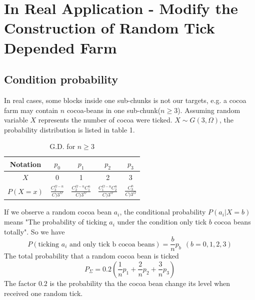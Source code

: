 \documentclass[UTF8,a4paper,15pt,titlepage,scale=0.8]{article}
\begin{document}
\section{In Real Application - Modify the Construction of Random Tick Depended Farm}
    \subsection{Condition probability}
        In real cases, some blocks inside one sub-chunks is not our targets, e.g. a cocoa farm may contain $n$ cocoa-beans in one sub-chunk($n\geq 3$). Assuming random variable $X$ represents the number of cocoa were ticked. $X \sim G(3,\Omega)$, the probability distribution is listed in table 1.
            \begin{table}[H]
                \centering
                \begin{tabular}{c|c|c|c|c}
                    \hline
                    Notation&$p_0$&$p_1$&$p_2$&$p_3$\\
                    \hline
                    $X$&0&1&2&3\\
                    \hline
                    $P(X=x)$&$\frac{C_3^{\Omega-n}}{C)3^{\Omega}}$&$\frac{C_2^{\Omega - n}C_1^n}{C)3^{\Omega}}$&$\frac{C_1^{\Omega-n}C_2^n}{C)3^{\Omega}}$&$\frac{C_3^n}{C)3^{\Omega}}$\\
                    \hline
                \end{tabular}
                \caption{G.D. for $n\ge 3$}
            \end{table}
        If we observe a random cocoa bean $a_i$, the conditional probability $P(a_i| X=b)$ means "The probability of ticking $a_i$ under the condition only tick $b$ cocoa beans totally". So we have 
            \begin{equation}
                P(\text{ticking $a_i$ and only tick b cocoa beans}) = \frac{b}{n}p_b \ \ (b=0,1,2,3)
            \end{equation}
        The total probability that a random cocoa bean is ticked 
            \begin{equation}
                P_\Sigma = 0.2 (\frac{1}{n}p_1 + \frac{2}{n}p_2 + \frac{3}{n}p_3)
            \end{equation}
        The factor $0.2$ is the probability tha the cocoa bean change its level when received one random tick.
\end{document}
